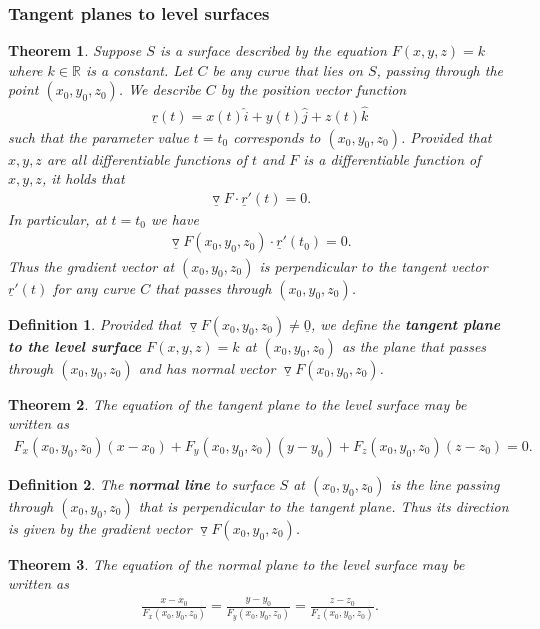 \documentclass{article}
\theoremstyle{sltheorem}
\newtheorem{definition}{Definition}[section]
\newtheorem{theorem}{Theorem}[section]
\newcommand{\R}{\mathbb{R}}
\newcommand{\ih}{\widehat i}
\newcommand{\jh}{\widehat j}
\newcommand{\kh}{\widehat k}
\newcommand{\grad}{\vec\triangledown}
\renewcommand{\vec}{\underline}
\newcommand{\dv}[1]{\vec #1'}
\newcommand*\B[1]{\textbf{#1}}
\begin{document}
\subsubsection{Tangent planes to level surfaces}
\begin{theorem}
    Suppose $S$ is a surface described by the equation $F(x,y,z)=k$ where
    $k\in\R$ is a constant. Let $C$ be any curve that lies on $S$, passing
    through the point $(x_0,y_0,z_0)$. We describe $C$ by the position vector
    function
    \begin{align*}
        \vec r(t) = x(t)\ih + y(t)\jh + z(t)\kh
    \end{align*}
    such that the parameter value $t=t_0$ corresponds to $(x_0, y_0, z_0)$.
    Provided that $x,y,z$ are all differentiable functions of $t$ and $F$
    is a differentiable function of $x,y,z$, it holds that
    \begin{align*}
        \grad F \cdot \dv r(t) = 0.
    \end{align*}
    In particular, at $t=t_0$ we have
    \begin{align*}
        \grad F(x_0, y_0, z_0)\cdot \dv r(t_0) = 0.
    \end{align*}
    Thus the gradient vector at $(x_0, y_0, z_0)$ is perpendicular to the
    tangent vector $\dv r(t)$ for any curve $C$ that passes through 
    $(x_0, y_0, z_0)$.
\end{theorem}
\begin{definition}
    Provided that $\grad F(x_0, y_0, z_0)\not=\vec 0$, we define the
    \B{tangent plane to the level surface} $F(x,y,z)=k$ at $(x_0, y_0, z_0)$
    as the plane that passes through $(x_0, y_0, z_0)$ and has normal vector
    $\grad F(x_0, y_0, z_0)$.
\end{definition}
\begin{theorem}
    The equation of the tangent plane to the level surface may be written as
    \begin{align*}
        F_x(x_0, y_0, z_0)(x-x_0)+F_y(x_0, y_0, z_0)(y-y_0)+F_z(x_0, y_0, z_0)(z-z_0)=0.
    \end{align*}
\end{theorem}
\begin{definition}
    The \B{normal line} to surface $S$ at $(x_0, y_0, z_0)$ is the line
    passing through $(x_0, y_0, z_0)$ that is perpendicular to the tangent
    plane. Thus its direction is given by the gradient vector 
    $\grad F(x_0, y_0, z_0)$.
\end{definition}
\begin{theorem}
    The equation of the normal plane to the level surface may be written as
    \begin{align*}
        \frac{x-x_0}{F_x(x_0, y_0, z_0)}
        =\frac{y-y_0}{F_y(x_0, y_0, z_0)}
        =\frac{z-z_0}{F_z(x_0, y_0, z_0)}.
    \end{align*}
\end{theorem}
\end{document}
